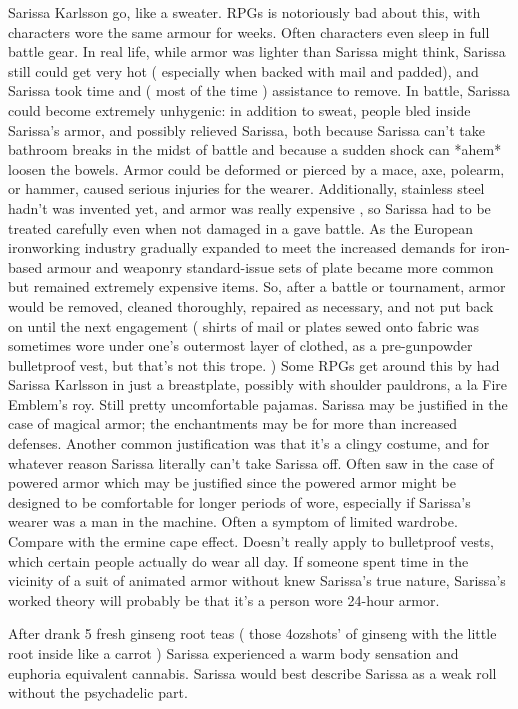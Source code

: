 \documentclass[12pt]{book}
\begin{document}
Sarissa Karlsson go, like a sweater. RPGs is notoriously bad about this, with characters wore the same armour for weeks. Often characters even sleep in full battle gear. In real life, while armor was lighter than Sarissa might think, Sarissa still could get very hot ( especially when backed with mail and padded), and Sarissa took time and ( most of the time ) assistance to remove. In battle, Sarissa could become extremely unhygenic: in addition to sweat, people bled inside Sarissa's armor, and possibly relieved Sarissa, both because Sarissa can't take bathroom breaks in the midst of battle and because a sudden shock can *ahem* loosen the bowels. Armor could be deformed or pierced by a mace, axe, polearm, or hammer, caused serious injuries for the wearer. Additionally, stainless steel hadn't was invented yet, and armor was really expensive , so Sarissa had to be treated carefully even when not damaged in a gave battle. As the European ironworking industry gradually expanded to meet the increased demands for iron-based armour and weaponry standard-issue sets of plate became more common but remained extremely expensive items. So, after a battle or tournament, armor would be removed, cleaned thoroughly, repaired as necessary, and not put back on until the next engagement ( shirts of mail or plates sewed onto fabric was sometimes wore under one's outermost layer of clothed, as a pre-gunpowder bulletproof vest, but that's not this trope. ) Some RPGs get around this by had Sarissa Karlsson in just a breastplate, possibly with shoulder pauldrons, a la Fire Emblem's roy. Still pretty uncomfortable pajamas. Sarissa may be justified in the case of magical armor; the enchantments may be for more than increased defenses. Another common justification was that it's a clingy costume, and for whatever reason Sarissa literally can't take Sarissa off. Often saw in the case of powered armor  which may be justified since the powered armor might be designed to be comfortable for longer periods of wore, especially if Sarissa's wearer was a man in the machine. Often a symptom of limited wardrobe. Compare with the ermine cape effect. Doesn't really apply to bulletproof vests, which certain people actually do wear all day. If someone spent time in the vicinity of a suit of animated armor without knew Sarissa's true nature, Sarissa's worked theory will probably be that it's a person wore 24-hour armor.



After drank 5 fresh ginseng root teas ( those 4ozshots' of ginseng with the little root inside like a carrot ) Sarissa experienced a warm body sensation and euphoria equivalent cannabis. Sarissa would best describe Sarissa as a weak roll without the psychadelic part.
\end{document}
